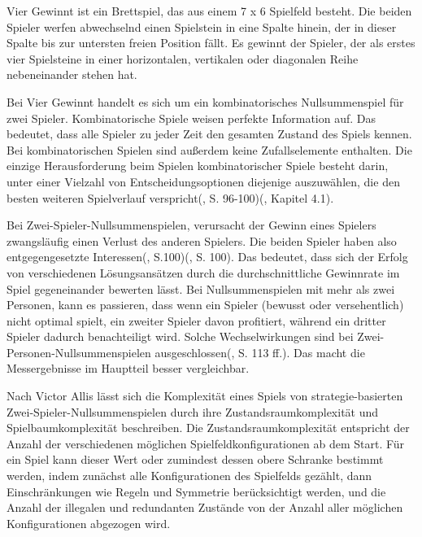 Vier Gewinnt ist ein Brettspiel, das aus einem 7 x 6 Spielfeld besteht. Die beiden Spieler werfen abwechselnd einen Spielstein in eine Spalte hinein, der in dieser Spalte bis zur untersten freien Position fällt. Es gewinnt der Spieler, der als erstes vier Spielsteine in einer horizontalen, vertikalen oder diagonalen Reihe nebeneinander stehen hat\cite{MiltonBradleyCompany.1990}.

Bei Vier Gewinnt handelt es sich um ein kombinatorisches Nullsummenspiel für zwei Spieler. Kombinatorische Spiele weisen \glqq perfekte Information \grqq{} auf. Das bedeutet, dass alle Spieler zu jeder Zeit den gesamten Zustand des Spiels kennen. Bei kombinatorischen Spielen sind außerdem keine Zufallselemente enthalten. Die einzige Herausforderung beim Spielen kombinatorischer Spiele besteht darin, unter einer Vielzahl von Entscheidungsoptionen diejenige auszuwählen, die den besten weiteren Spielverlauf verspricht(\cite{Bewersdorff.2018}, S. 96-100)(\cite{Ferguson.January2019}, Kapitel 4.1).

Bei Zwei-Spieler-Nullsummenspielen, verursacht der Gewinn eines Spielers zwangsläufig einen Verlust des anderen Spielers. Die beiden Spieler haben also entgegengesetzte Interessen(\cite{Bewersdorff.2018}, S.100)(\cite{Allis.1994}, S. 100). Das bedeutet, dass sich der Erfolg von verschiedenen Lösungsansätzen durch die durchschnittliche Gewinnrate im Spiel gegeneinander bewerten lässt. Bei Nullsummenspielen mit mehr als zwei Personen, kann es passieren, dass wenn ein Spieler (bewusst oder versehentlich) nicht optimal spielt, ein zweiter Spieler davon profitiert, während ein dritter Spieler dadurch benachteiligt wird. Solche Wechselwirkungen sind bei Zwei-Personen-Nullsummenspielen ausgeschlossen(\cite{Bewersdorff.2018}, S. 113 ff.). Das macht die Messergebnisse im Hauptteil besser vergleichbar.

Nach Victor Allis lässt sich die Komplexität eines Spiels von strategie-basierten Zwei-Spieler-Nullsummenspielen durch ihre Zustandsraumkomplexität und Spielbaumkomplexität beschreiben. Die Zustandsraumkomplexität entspricht der Anzahl der verschiedenen möglichen Spielfeldkonfigurationen ab dem Start. Für ein Spiel kann dieser Wert oder zumindest dessen obere Schranke bestimmt werden, indem zunächst alle Konfigurationen des Spielfelds gezählt, dann Einschränkungen wie Regeln und Symmetrie berücksichtigt werden, und die Anzahl der illegalen und redundanten Zustände von der Anzahl aller möglichen Konfigurationen abgezogen wird.


